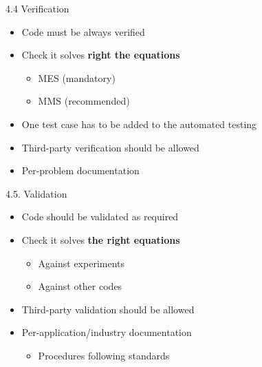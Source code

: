 \documentclass[
  ignorenonframetext,
  aspectratio=169,
]{beamer}
\providecommand{\tightlist}{%
  \setlength{\itemsep}{0pt}\setlength{\parskip}{0pt}}
\begin{document}
\begin{frame}[fragile]{}
\protect\hypertarget{section-13}{}
\begin{columns}[T]
\begin{column}{0.5\textwidth}
\begin{block}{4.4 Verification}
\protect\hypertarget{verification}{}
\begin{itemize}
\tightlist
\item
  Code must be always verified
\item
  Check it solves \textbf{right the equations}

  \begin{itemize}
  \tightlist
  \item
    MES (mandatory)
  \item
    MMS (recommended)
  \end{itemize}
\item
  One test case has to be added to the automated testing
\item
  Third-party verification should be allowed
\item
  Per-problem documentation
\end{itemize}
\end{block}

\begin{block}{4.5. Validation}
\protect\hypertarget{validation}{}
\begin{itemize}
\tightlist
\item
  Code should be validated as required
\item
  Check it solves \textbf{the right equations}

  \begin{itemize}
  \tightlist
  \item
    Against experiments
  \item
    Against other codes
  \end{itemize}
\item
  Third-party validation should be allowed
\item
  Per-application/industry documentation

  \begin{itemize}
  \tightlist
  \item
    Procedures following standards
  \end{itemize}
\end{itemize}
\end{block}
\end{column}

\pause


\end{columns}
\end{frame}
\end{document}
